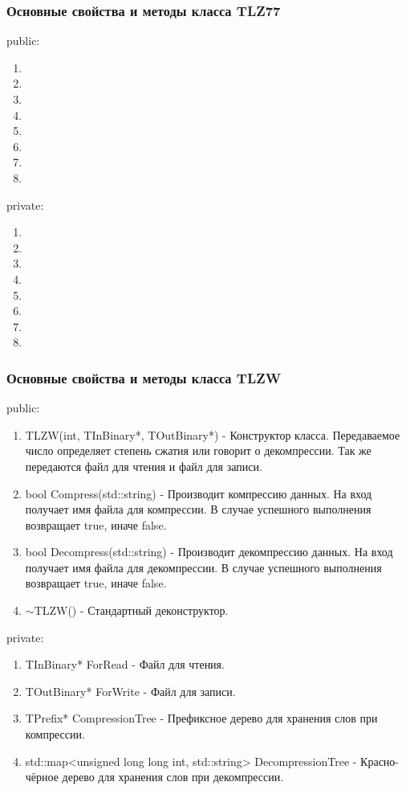 \documentclass[12pt]{article}
\begin{document}
\subsubsection*{Основные свойства и методы класса TLZ77}%
\noindent
public:

\begin{enumerate}
	\item 
	\item 
	\item 
	\item 
	\item 
	\item 
	\item 
	\item 
\end{enumerate}
\noindent
private:

\begin{enumerate}
	\item 
	\item 
	\item 
	\item 
	\item 
	\item 
	\item 
	\item 
\end{enumerate}

\subsubsection*{Основные свойства и методы класса TLZW}
\noindent
public:

\begin{enumerate}
	\item TLZW(int, TInBinary*, TOutBinary*) - Конструктор класса. Передаваемое число определяет степень сжатия или говорит о декомпрессии. Так же передаются файл для чтения и файл для записи.
	\item bool Compress(std::string) - Производит компрессию данных. На вход получает имя файла для компрессии. В случае успешного выполнения возвращает true, иначе false.
	\item bool Decompress(std::string) - Производит декомпрессию данных. На вход получает имя файла для декомпрессии. В случае успешного выполнения возвращает true, иначе false.
	\item $\sim$TLZW() - Стандартный деконструктор.
\end{enumerate}
\noindent
private:

\begin{enumerate}
	\item TInBinary* ForRead - Файл для чтения.
	\item TOutBinary* ForWrite - Файл для записи.
	\item TPrefix* CompressionTree - Префиксное дерево для хранения слов при компрессии.
	\item std::map<unsigned long long int, std::string> DecompressionTree - Красно-чёрное дерево для хранения слов при декомпрессии.
\end{enumerate}
\end{document}
